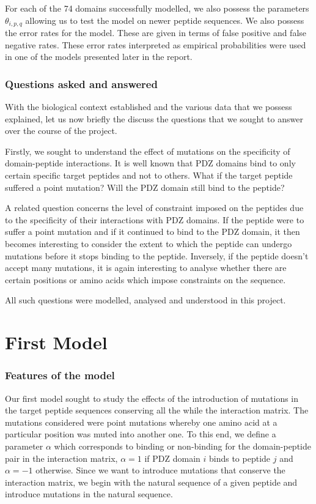 \documentclass[a4paper, 12pt]{article}
\begin{document}
	For each of the 74 domains successfully modelled, we also possess the parameters $\theta_{i,p,q}$ allowing us to test the model on newer peptide sequences. We also possess the error rates for the model. These are given in terms of false positive and false negative rates. These error rates interpreted as empirical probabilities were used in one of the models presented later in the report.

	\section{Questions asked and answered}

	With the biological context established and the various data that we possess explained, let us now briefly the discuss the questions that we sought to answer over the course of the project. 

	Firstly, we sought to understand the effect of mutations on the specificity of domain-peptide interactions. It is well known that PDZ domains bind to only certain specific target peptides and not to others. What if the target peptide suffered a point mutation? Will the PDZ domain still bind to the peptide? 

	A related question concerns the level of constraint imposed on the peptides due to the specificity of their interactions with PDZ domains. If the peptide were to suffer a point mutation and if it continued to bind to the PDZ domain, it then becomes interesting to consider the extent to which the peptide can undergo mutations before it stops binding to the peptide. Inversely, if the peptide doesn't accept many mutations, it is again interesting to analyse whether there are certain positions or amino acids which impose constraints on the sequence. 

	All such questions were modelled, analysed and understood in this project.

\pagebreak
\part{First Model}
	\section{Features of the model}

	Our first model sought to study the effects of the introduction of mutations in the target peptide sequences conserving all the while the interaction matrix. The mutations considered were point mutations whereby one amino acid at a particular position was muted into another one. To this end, we define a parameter $\alpha$ which corresponds to binding or non-binding for the domain-peptide pair in the interaction matrix, $\alpha=1$ if PDZ domain $i$ binds to peptide $j$ and $\alpha = -1$ otherwise. Since we want to introduce mutations that conserve the interaction matrix, we begin with the natural sequence of a given peptide and introduce mutations in the natural sequence. 
\end{document}
